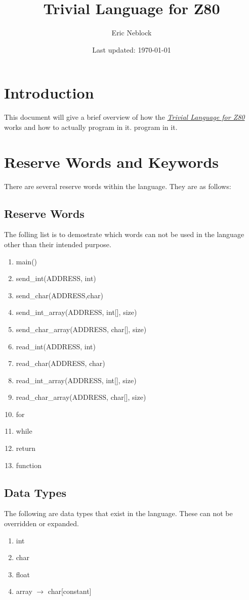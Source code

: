 \documentclass[letterpaper, 12pt]{article}
\begin{document}
\author{Eric Neblock}
\title{Trivial Language for Z80}
\date{Last updated: \today}
\maketitle
\section{Introduction}
This document will give a brief overview of how the \textit{\underline{Trivial
  Language for Z80}} works and how to actually program in it.
program in it. 
\section{Reserve Words and Keywords}
There are several reserve words within the language. They are as follows:
\subsection{Reserve Words}
The folling list is to demostrate which words can not be used in the language
other than their intended purpose.
\begin{enumerate}
\item main()
\item send\_int(ADDRESS, int)
\item send\_char(ADDRESS,char)
\item send\_int\_array(ADDRESS, int[], size)
\item send\_char\_array(ADDRESS, char[], size)
\item read\_int(ADDRESS, int)
\item read\_char(ADDRESS, char)
\item read\_int\_array(ADDRESS, int[], size)
\item read\_char\_array(ADDRESS, char[], size)
\item for
\item while
\item return
\item function
\end{enumerate}
\subsection{Data Types}
The following are data types that exist in the language. These can not be
overridden or expanded.
\begin{enumerate}
\item int
\item char
\item float
\item array $\rightarrow$ char[constant]
\end{enumerate}
\end{document}
